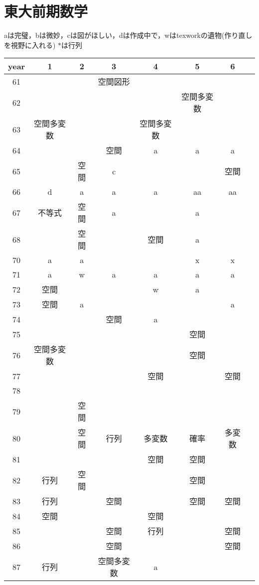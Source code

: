 \documentclass[a4j]{jarticle}
\title{}
\begin{document}

\section{東大前期数学}
aは完璧，bは微妙，cは図がほしい，dは作成中で，wはtexworkの遺物(作り直しを視野に入れる)
$*$は行列
          \begin{tabular}{|c|c|c|c|c|c|c|c|} \hline
          year&1&2&3&4&5&6& \\ \hline
          61&&&空間図形&&&& \\ \hline
          62&&&&&空間多変数&& \\ \hline
          63&空間多変数&&&空間多変数&&& \\ \hline
          64&&&空間&a&a&a& \\ \hline
          65&&空間&c&&&空間& \\ \hline
          66&d&a&a&a&aa&aa& \\ \hline
          67&不等式&空間&a&&a&& \\ \hline
          68&&空間&&空間&a&& \\ \hline
          70&a&a&&&x&x& \\ \hline
          71&a&w&a&a&a&a& \\ \hline
          72&空間&&&w&a&& \\ \hline
          73&空間&a&&&&a& \\ \hline
          74&&&空間&a&&& \\ \hline
          75&&&&&空間&& \\ \hline
          76&空間多変数&&&&空間&& \\ \hline
          77&&&&空間&&空間& \\ \hline
          78&&&&&&& \\ \hline
          79&&空間&&&&& \\ \hline
          80&&空間&行列&多変数&確率&多変数& \\ \hline
          81&&&&空間&空間&& \\ \hline
          82&行列&空間&&&空間&& \\ \hline
          83&行列&&空間&&空間&空間& \\ \hline
          84&空間&&&空間&&& \\ \hline
          85&&&空間&行列&&空間& \\ \hline
          86&&&空間&&&空間& \\ \hline
          87&行列&&空間多変数&a&&& \\ \hline
          \end{tabular}
\end{document}
